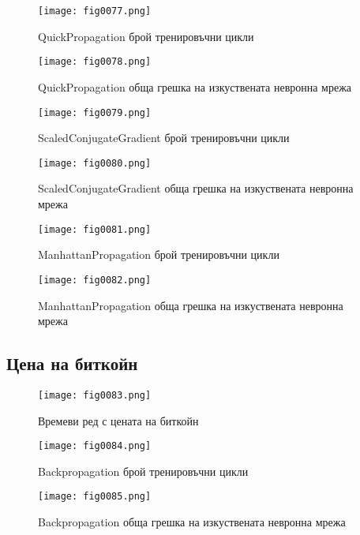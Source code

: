 \begin{figure}[H]
  \centering
  \texttt{[image: fig0077.png]}
  \caption{QuickPropagation брой тренировъчни цикли}
\label{fig0077}
\end{figure}

\begin{figure}[H]
  \centering
  \texttt{[image: fig0078.png]}
  \caption{QuickPropagation обща грешка на изкуствената невронна мрежа}
\label{fig0078}
\end{figure}

\begin{figure}[H]
  \centering
  \texttt{[image: fig0079.png]}
  \caption{ScaledConjugateGradient брой тренировъчни цикли}
\label{fig0079}
\end{figure}

\begin{figure}[H]
  \centering
  \texttt{[image: fig0080.png]}
  \caption{ScaledConjugateGradient обща грешка на изкуствената невронна мрежа}
\label{fig0080}
\end{figure}

\begin{figure}[H]
  \centering
  \texttt{[image: fig0081.png]}
  \caption{ManhattanPropagation брой тренировъчни цикли}
\label{fig0081}
\end{figure}

\begin{figure}[H]
  \centering
  \texttt{[image: fig0082.png]}
  \caption{ManhattanPropagation обща грешка на изкуствената невронна мрежа}
\label{fig0082}
\end{figure}

\subsection{Цена на биткойн}

\begin{figure}[H]
  \centering
  \texttt{[image: fig0083.png]}
  \caption{Времеви ред с цената на биткойн}
\label{fig0083}
\end{figure}

\begin{figure}[H]
  \centering
  \texttt{[image: fig0084.png]}
  \caption{Backpropagation брой тренировъчни цикли}
\label{fig0084}
\end{figure}

\begin{figure}[H]
  \centering
  \texttt{[image: fig0085.png]}
  \caption{Backpropagation обща грешка на изкуствената невронна мрежа}
\label{fig0085}
\end{figure}

